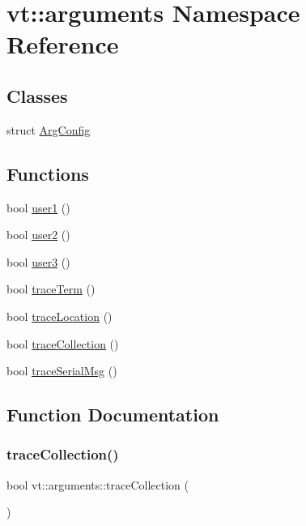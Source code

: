 \hypertarget{namespacevt_1_1arguments}{}\section{vt\+:\+:arguments Namespace Reference}
\label{namespacevt_1_1arguments}
\subsection*{Classes}
\begin{DoxyCompactItemize}
\item 
struct \hyperlink{structvt_1_1arguments_1_1_arg_config}{Arg\+Config}
\end{DoxyCompactItemize}
\subsection*{Functions}
\begin{DoxyCompactItemize}
\item 
bool \hyperlink{namespacevt_1_1arguments_afe229ddf0b473e54fac5ff6884b07ad0}{user1} ()
\item 
bool \hyperlink{namespacevt_1_1arguments_ae58fe1d056c863f7d8103e9c240d17f2}{user2} ()
\item 
bool \hyperlink{namespacevt_1_1arguments_afedf2c9949568b862ec5f8274ef6846b}{user3} ()
\item 
bool \hyperlink{namespacevt_1_1arguments_a60b229dc93c6fce2f24faa8237137a89}{trace\+Term} ()
\item 
bool \hyperlink{namespacevt_1_1arguments_aa49925bcb858fa5bb4779a8e5db3b368}{trace\+Location} ()
\item 
bool \hyperlink{namespacevt_1_1arguments_ae1a1115524b75b6cc64e19968ff16c09}{trace\+Collection} ()
\item 
bool \hyperlink{namespacevt_1_1arguments_ad239f3b085f99c963780dbcb0efd5668}{trace\+Serial\+Msg} ()
\end{DoxyCompactItemize}


\subsection{Function Documentation}
\mbox{\label{namespacevt_1_1arguments_ae1a1115524b75b6cc64e19968ff16c09}} 
\subsubsection{\texorpdfstring{trace\+Collection()}{traceCollection()}}
{\footnotesize\ttfamily bool vt\+::arguments\+::trace\+Collection (\begin{DoxyParamCaption}{ }\end{DoxyParamCaption})\hspace{0.3cm}{\ttfamily [inline]}}

